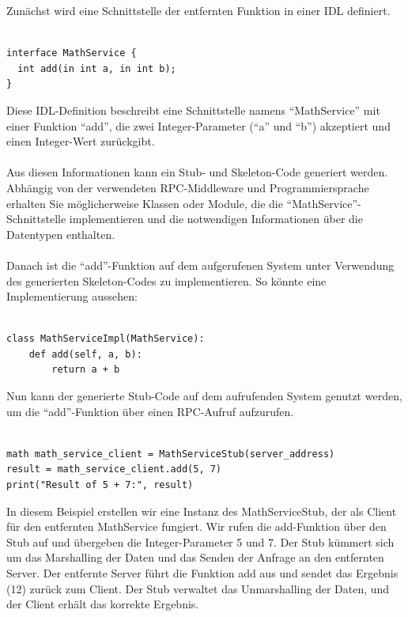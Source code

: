 \documentclass[../vs-script-first-v01.tex]{subfiles}
\begin{document}
Zunächst wird eine Schnittstelle der entfernten Funktion in einer IDL definiert. \\\\
\noindent\begin{minipage}{\textwidth}
\begin{lstlisting}[caption={IDL Example},captionpos=b,label={lst:idl-example}]
interface MathService {
  int add(in int a, in int b);
}
\end{lstlisting}
\end{minipage}
Diese IDL-Definition beschreibt eine Schnittstelle namens \enquote{MathService} mit einer Funktion \enquote{add}, die zwei Integer-Parameter (\enquote{a} und \enquote{b}) akzeptiert und einen Integer-Wert zurückgibt.
\\\\
Aus diesen Informationen kann ein  Stub- und Skeleton-Code generiert werden. Abhängig von der verwendeten RPC-Middleware und Programmiersprache erhalten Sie möglicherweise Klassen oder Module, die die \enquote{MathService}-Schnittstelle implementieren und die notwendigen Informationen über die Datentypen enthalten.
\\\\
Danach ist die \enquote{add}-Funktion auf dem aufgerufenen System unter Verwendung des generierten Skeleton-Codes zu implementieren. So könnte eine Implementierung aussehen:\\\\
\noindent\begin{minipage}{\textwidth}
\begin{lstlisting}[caption={RPC IDL Service Impl},captionpos=b,label={lst:idl-impl}]
class MathServiceImpl(MathService):
    def add(self, a, b):
        return a + b
\end{lstlisting}
\end{minipage}
Nun kann der generierte Stub-Code auf dem aufrufenden System genutzt werden, um die \enquote{add}-Funktion über einen RPC-Aufruf aufzurufen.\\\\
\noindent\begin{minipage}{\textwidth}
\begin{lstlisting}[caption={RPC IDL Service Impl},captionpos=b,label={lst:idl-impl-service}]
math math_service_client = MathServiceStub(server_address)
result = math_service_client.add(5, 7)
print("Result of 5 + 7:", result)
\end{lstlisting}
\end{minipage}
In diesem Beispiel erstellen wir eine Instanz des MathServiceStub, der als Client für den entfernten MathService fungiert. Wir rufen die add-Funktion über den Stub auf und übergeben die Integer-Parameter 5 und 7. Der Stub kümmert sich um das Marshalling der Daten und das Senden der Anfrage an den entfernten Server. Der entfernte Server führt die Funktion add aus und sendet das Ergebnis (12) zurück zum Client. Der Stub verwaltet das Unmarshalling der Daten, und der Client erhält das korrekte Ergebnis.
\end{document}
